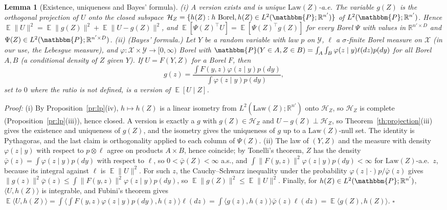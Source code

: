 \documentclass{article}
\DeclareMathOperator{\E}{\mathbb{E}}
\newcommand{\RR}{\mathbb{R}}
\newcommand{\PP}{\mathbbm{P}}
\theoremstyle{plain}
\newtheorem{lemma}[theorem]{Lemma}
\theoremstyle{remark}
\begin{document}
\begin{lemma}[Existence, uniqueness and Bayes' formula]\label{lem:condexp}
(i) A version exists and is unique $\mathrm{Law}(Z)$-a.e. The variable $g(Z)$ is the orthogonal projection of $U$ onto the closed subspace
$\mathcal H_Z=\{h(Z):h\text{ Borel},h(Z)\in L^2(\PP;\RR^{n'})\}$ of $L^2(\PP;\RR^{n'})$. Hence $\E\|U\|^2=\E\|g(Z)\|^2+\E\|U-g(Z)\|^2$, and
$\E[\Psi(Z)^\top U]=\E[\Psi(Z)^\top g(Z)]$ for every Borel $\Psi$ with values in $\RR^{n'\times D}$ and $\Psi(Z)\in L^2(\PP;\RR^{n'\times D})$.
(ii) (Bayes' formula.) Let $Y$ be a random variable with law $p$ on $\mathcal Y$, $\ell$ a $\sigma$-finite Borel measure on $\mathcal X$ (in our use, the
Lebesgue measure), and $\varphi:\mathcal X\times\mathcal Y\to[0,\infty)$ Borel with $\PP(Y\in A,Z\in B)=\int_A\int_B\varphi(z\mid y)\ell(dz)p(dy)$ for all Borel
$A,B$ (a \emph{conditional density} of $Z$ given $Y$). If $U=F(Y,Z)$ for a Borel $F$, then
\[
g(z)=\frac{\int F(y,z)\varphi(z\mid y)p(dy)}{\int\varphi(z\mid y)p(dy)},
\]
set to $0$ where the ratio is not defined, is a version of $\E[U\mid Z]$.
\end{lemma}
\textit{Proof:}
(i) By Proposition~\ref{pr:lp}(iv), $h\mapsto h(Z)$ is a linear isometry from $L^2(\mathrm{Law}(Z);\RR^{n'})$ onto $\mathcal H_Z$, so $\mathcal H_Z$ is complete
(Proposition~\ref{pr:lp}(iii)), hence closed. A version is exactly a $g$ with $g(Z)\in\mathcal H_Z$ and $U-g(Z)\perp\mathcal H_Z$, so
Theorem~\ref{th:projection}(iii) gives the existence and uniqueness of $g(Z)$, and the isometry gives the uniqueness of $g$ up to a
$\mathrm{Law}(Z)$-null set. The identity is Pythagoras, and the last claim is orthogonality applied to each column of $\Psi(Z)$.
(ii) The law of $(Y,Z)$ and the measure with density $\varphi(z\mid y)$ with respect to $p\otimes\ell$ agree on products $A\times B$, hence coincide;
by Tonelli's theorem, $Z$ has the density $\bar\varphi(z)=\int\varphi(z\mid y)p(dy)$ with respect to $\ell$, so $0<\bar\varphi(Z)<\infty$ a.s., and
$\int\|F(y,z)\|^2\varphi(z\mid y)p(dy)<\infty$ for $\mathrm{Law}(Z)$-a.e.\ $z$, because its integral against $\ell$ is $\E\|U\|^2$. For such $z$, the
Cauchy--Schwarz inequality under the probability $\varphi(z\mid\cdot)p/\bar\varphi(z)$ gives $\|g(z)\|^2\bar\varphi(z)\le\int\|F(y,z)\|^2\varphi(z\mid y)p(dy)$,
so $\E\|g(Z)\|^2\le\E\|U\|^2$. Finally, for $h(Z)\in L^2(\PP;\RR^{n'})$, $\langle U,h(Z)\rangle$ is integrable, and Fubini's theorem gives
$\E\langle U,h(Z)\rangle=\int\langle\int F(y,z)\varphi(z\mid y)p(dy),h(z)\rangle\ell(dz)=\int\langle g(z),h(z)\rangle\bar\varphi(z)\ell(dz)=\E\langle g(Z),h(Z)\rangle$.
\hfill$\square$
\end{document}
